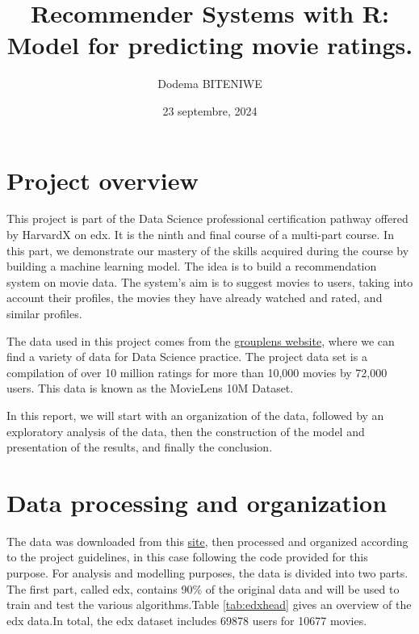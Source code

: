 \documentclass[
]{article}
\title{Recommender Systems with R: Model for predicting movie ratings.}
\author{Dodema BITENIWE}
\date{23 septembre, 2024}
\begin{document}
\maketitle

{
\hypersetup{linkcolor=}
\setcounter{tocdepth}{2}
\tableofcontents
}
\newpage

\section{Project overview}\label{project-overview}

This project is part of the Data Science professional certification pathway offered by HarvardX on edx. It is the ninth and final course of a multi-part course. In this part, we demonstrate our mastery of the skills acquired during the course by building a machine learning model. The idea is to build a recommendation system on movie data. The system's aim is to suggest movies to users, taking into account their profiles, the movies they have already watched and rated, and similar profiles.

The data used in this project comes from the \href{https://grouplens.org/datasets/movielens/latest/}{grouplens website}, where we can find a variety of data for Data Science practice. The project data set is a compilation of over 10 million ratings for more than 10,000 movies by 72,000 users. This data is known as the MovieLens 10M Dataset.

In this report, we will start with an organization of the data, followed by an exploratory analysis of the data, then the construction of the model and presentation of the results, and finally the conclusion.

\section{Data processing and organization}\label{data-processing-and-organization}

The data was downloaded from this \href{http://grouplens.org/datasets/movielens/10m/}{site}, then processed and organized according to the project guidelines, in this case following the code provided for this purpose. For analysis and modelling purposes, the data is divided into two parts. The first part, called edx, contains 90\% of the original data and will be used to train and test the various algorithms.Table \ref{tab:edxhead} gives an overview of the edx data.In total, the edx dataset includes 69878 users for 10677 movies.
\end{document}
